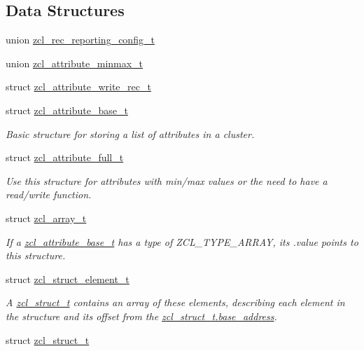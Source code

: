 \subsection*{Data Structures}
\begin{DoxyCompactItemize}
\item 
union \hyperlink{unionzcl__rec__reporting__config__t}{zcl\-\_\-rec\-\_\-reporting\-\_\-config\-\_\-t}
\item 
union \hyperlink{unionzcl__attribute__minmax__t}{zcl\-\_\-attribute\-\_\-minmax\-\_\-t}
\item 
struct \hyperlink{structzcl__attribute__write__rec__t}{zcl\-\_\-attribute\-\_\-write\-\_\-rec\-\_\-t}
\item 
struct \hyperlink{structzcl__attribute__base__t}{zcl\-\_\-attribute\-\_\-base\-\_\-t}
\begin{DoxyCompactList}\small\item\em Basic structure for storing a list of attributes in a cluster. \end{DoxyCompactList}\item 
struct \hyperlink{structzcl__attribute__full__t}{zcl\-\_\-attribute\-\_\-full\-\_\-t}
\begin{DoxyCompactList}\small\item\em Use this structure for attributes with min/max values or the need to have a read/write function. \end{DoxyCompactList}\item 
struct \hyperlink{structzcl__array__t}{zcl\-\_\-array\-\_\-t}
\begin{DoxyCompactList}\small\item\em If a \hyperlink{structzcl__attribute__base__t}{zcl\-\_\-attribute\-\_\-base\-\_\-t} has a type of Z\-C\-L\-\_\-\-T\-Y\-P\-E\-\_\-\-A\-R\-R\-A\-Y, its .value points to this structure. \end{DoxyCompactList}\item 
struct \hyperlink{structzcl__struct__element__t}{zcl\-\_\-struct\-\_\-element\-\_\-t}
\begin{DoxyCompactList}\small\item\em A \hyperlink{structzcl__struct__t}{zcl\-\_\-struct\-\_\-t} contains an array of these elements, describing each element in the structure and its offset from the \hyperlink{group__zcl_ga2c4fcaeccedd1b62207f9bb03a26fdf1}{zcl\-\_\-struct\-\_\-t.\-base\-\_\-address}. \end{DoxyCompactList}\item 
struct \hyperlink{structzcl__struct__t}{zcl\-\_\-struct\-\_\-t}

\end{DoxyCompactItemize}
